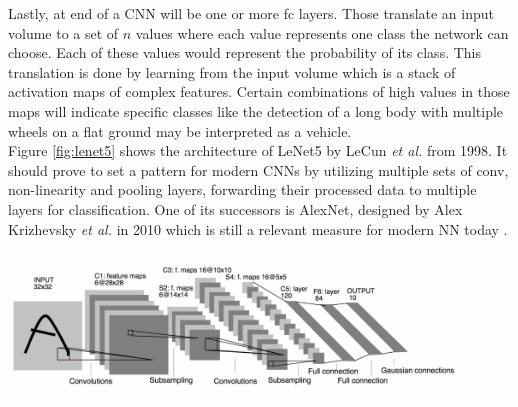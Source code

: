 Lastly, at end of a \ac{CNN} will be one or more \ac{fc} layers. Those translate an input volume to a set of $n$ values where each value represents one class the network can choose. Each of these values would represent the probability of its class. This translation is done by learning from the input volume which is a stack of activation maps of complex features. Certain combinations of high values in those maps will indicate specific classes like the detection of a long body with multiple wheels on a flat ground may be interpreted as a vehicle.\\
Figure \ref{fig:lenet5} shows the architecture of LeNet5 by LeCun \textit{et al.} from 1998. It should prove to set a pattern for modern \acp{CNN} by utilizing multiple sets of \ac{conv}, non-linearity and pooling layers, forwarding their processed data to multiple layers for classification. One of its successors is AlexNet, designed by Alex Krizhevsky \textit{et al.} in 2010 \cite{NIPS2012_4824} which is still a relevant measure for modern \ac{NN} today \cite{DBLP:journals/corr/CanzianiPC16}.

\begin{center}
\noindent\includegraphics[width=12cm]{tex/img/ch03/LeNet5.png}
\label{fig:lenet5}
\end{center}

